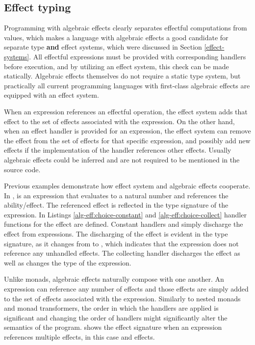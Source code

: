 


\subsection{Effect typing}
Programming with algebraic effects clearly separates effectful computations from values, which makes a language with algebraic effects a good candidate for separate type \textbf{and} effect systems, which were discussed in Section \ref{effect-systems}. All effectful expressions must be provided with corresponding handlers before execution, and by utilizing an effect system, this check can be made statically. Algebraic effects themselves do not require a static type system, but practically all current programming languages with first-class algebraic effects are equipped with an effect system.

When an expression references an effectful operation, the effect system adds that effect to the set of effects associated with the expression. On the other hand, when an effect handler is provided for an expression, the effect system can remove the effect from the set of effects for that specific expression, and possibly add new effects if the implementation of the handler references other effects. Usually algebraic effects could be inferred and are not required to be mentioned in the source code.

Previous examples demonstrate how effect system and algebraic effects cooperate. In ,  is an expression that evaluates to a natural number and references the  ability/effect. The referenced effect is reflected in the type signature of the expression. In Listings \ref{alg-eff:choice-constant} and \ref{alg-eff:choice-collect} handler functions for the  effect are defined. Constant handlers  and  simply discharge the effect from expressions. The discharging of the effect is evident in the type signature, as it changes from  to , which indicates that the expression does not reference any unhandled effects. The collecting handler  discharges the effect as well as changes the type of the expression.

Unlike monads, algebraic effects naturally compose with one another. An expression can reference any number of effects and those effects are simply added to the set of effects associated with the expression. Similarly to nested monads and monad transformers, the order in which the handlers are applied is significant and changing the order of handlers might significantly alter the semantics of the program.  shows the effect signature when an expression references multiple effects, in this case  and  effects.

